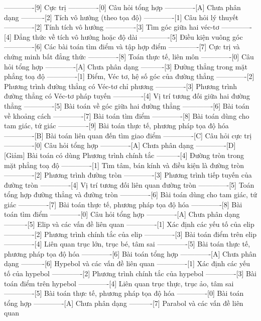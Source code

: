 -------------[9] Cực trị
-------------[0] Câu hỏi tổng hợp
-------------[A] Chưa phân dạng
----------[2] Tích vô hướng (theo tọa độ)
-------------[1] Câu hỏi lý thuyết
-------------[2] Tính tích vô hướng
-------------[3] Tìm góc giữa hai véc-tơ
-------------[4] Đẳng thức về tích vô hướng hoặc độ dài
-------------[5] Điều kiện vuông góc
-------------[6] Các bài toán tìm điểm và tập hợp điểm
-------------[7] Cực trị và chứng minh bất đẳng thức
-------------[8] Toán thực tế, liên môn
-------------[0] Câu hỏi tổng hợp
-------------[A] Chưa phân dạng
----------[3] Đường thẳng trong mặt phẳng toạ độ
-------------[1] Điểm, Véc tơ, hệ số góc của đường thẳng
-------------[2] Phương trình đường thẳng có Véc-tơ chỉ phương
-------------[3] Phương trình đường thẳng có Véc-tơ pháp tuyến
-------------[4] Vị trí tương đối giữa hai đường thẳng
-------------[5] Bài toán về góc giữa hai đường thẳng
-------------[6] Bài toán về khoảng cách
-------------[7] Bài toán tìm điểm
-------------[8] Bài toán dùng cho tam giác, tứ giác
-------------[9] Bài toán thực tế, phương pháp tọa độ hóa
-------------[B] Bài toán liên quan đến tìm giao điểm
-------------[C] Câu hỏi cực trị
-------------[0] Câu hỏi tổng hợp
-------------[A] Chưa phân dạng
-------------[D] [Giảm] Bài toán có dùng Phương trình chính tắc
----------[4] Đường tròn trong mặt phẳng toạ độ
-------------[1] Tìm tâm, bán kính và điều kiện là đường tròn
-------------[2] Phương trình đường tròn
-------------[3] Phương trình tiếp tuyến của đường tròn
-------------[4] Vị trí tương đối liên quan đường tròn
-------------[5] Toán tổng hợp đường thẳng và đường tròn
-------------[6] Bài toán dùng cho tam giác, tứ giác
-------------[7] Bài toán thực tế, phương pháp tọa độ hóa
-------------[8] Bài toán tìm điểm
-------------[0] Câu hỏi tổng hợp
-------------[A] Chưa phân dạng
----------[5] Elip và các vấn đề liên quan
-------------[1] Xác định các yếu tố của elip
-------------[2] Phương trình chính tắc của elip
-------------[3] Bài toán điểm trên elip
-------------[4] Liên quan trục lớn, trục bé, tâm sai
-------------[5] Bài toán thực tế, phương pháp tọa độ hóa
-------------[6] Bài toán tổng hợp
-------------[A] Chưa phân dạng
----------[6] Hypebol và các vấn đề liên quan
-------------[1] Xác định các yếu tố của hypebol
-------------[2] Phương trình chính tắc của hypebol
-------------[3] Bài toán điểm trên hypebol
-------------[4] Liên quan trục thực, trục ảo, tâm sai
-------------[5] Bài toán thực tế, phương pháp tọa độ hóa
-------------[0] Bài toán tổng hợp
-------------[A] Chưa phân dạng
----------[7] Parabol và các vấn đề liên quan
